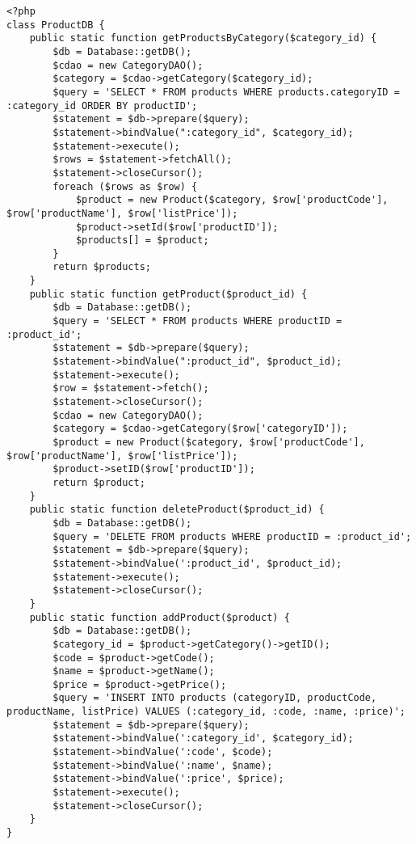 \begin{enumerate}
\begin{lstlisting}
<?php
class ProductDB {
    public static function getProductsByCategory($category_id) {
        $db = Database::getDB();
        $cdao = new CategoryDAO();
        $category = $cdao->getCategory($category_id);
        $query = 'SELECT * FROM products WHERE products.categoryID = :category_id ORDER BY productID';
        $statement = $db->prepare($query);
        $statement->bindValue(":category_id", $category_id);
        $statement->execute();
        $rows = $statement->fetchAll();
        $statement->closeCursor();
        foreach ($rows as $row) {
            $product = new Product($category, $row['productCode'], $row['productName'], $row['listPrice']);
            $product->setId($row['productID']);
            $products[] = $product;
        }
        return $products;
    }
    public static function getProduct($product_id) {
        $db = Database::getDB();
        $query = 'SELECT * FROM products WHERE productID = :product_id';
        $statement = $db->prepare($query);
        $statement->bindValue(":product_id", $product_id);
        $statement->execute();
        $row = $statement->fetch();
        $statement->closeCursor();
        $cdao = new CategoryDAO();
        $category = $cdao->getCategory($row['categoryID']);
        $product = new Product($category, $row['productCode'], $row['productName'], $row['listPrice']);
        $product->setID($row['productID']);
        return $product;
    }
    public static function deleteProduct($product_id) {
        $db = Database::getDB();
        $query = 'DELETE FROM products WHERE productID = :product_id';
        $statement = $db->prepare($query);
        $statement->bindValue(':product_id', $product_id);
        $statement->execute();
        $statement->closeCursor();
    }
    public static function addProduct($product) {
        $db = Database::getDB();
        $category_id = $product->getCategory()->getID();
        $code = $product->getCode();
        $name = $product->getName();
        $price = $product->getPrice();
        $query = 'INSERT INTO products (categoryID, productCode, productName, listPrice) VALUES (:category_id, :code, :name, :price)';
        $statement = $db->prepare($query);
        $statement->bindValue(':category_id', $category_id);
        $statement->bindValue(':code', $code);
        $statement->bindValue(':name', $name);
        $statement->bindValue(':price', $price);
        $statement->execute();
        $statement->closeCursor();
    }
}
\end{lstlisting}

\end{enumerate}
